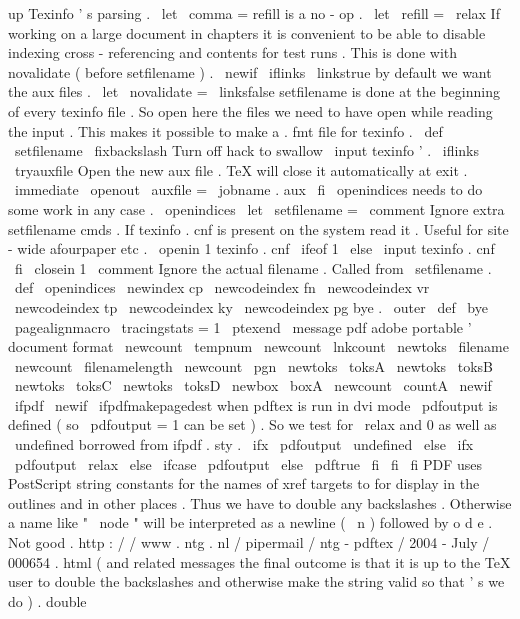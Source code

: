 up
%
Texinfo
'
s
parsing
.
%
\
let
\
comma
=
%
refill
is
a
no
-
op
.
\
let
\
refill
=
\
relax
%
If
working
on
a
large
document
in
chapters
it
is
convenient
to
%
be
able
to
disable
indexing
cross
-
referencing
and
contents
for
test
runs
.
%
This
is
done
with
novalidate
(
before
setfilename
)
.
%
\
newif
\
iflinks
\
linkstrue
%
by
default
we
want
the
aux
files
.
\
let
\
novalidate
=
\
linksfalse
%
setfilename
is
done
at
the
beginning
of
every
texinfo
file
.
%
So
open
here
the
files
we
need
to
have
open
while
reading
the
input
.
%
This
makes
it
possible
to
make
a
.
fmt
file
for
texinfo
.
\
def
\
setfilename
{
%
\
fixbackslash
%
Turn
off
hack
to
swallow
\
input
texinfo
'
.
\
iflinks
\
tryauxfile
%
Open
the
new
aux
file
.
TeX
will
close
it
automatically
at
exit
.
\
immediate
\
openout
\
auxfile
=
\
jobname
.
aux
\
fi
%
\
openindices
needs
to
do
some
work
in
any
case
.
\
openindices
\
let
\
setfilename
=
\
comment
%
Ignore
extra
setfilename
cmds
.
%
%
If
texinfo
.
cnf
is
present
on
the
system
read
it
.
%
Useful
for
site
-
wide
afourpaper
etc
.
\
openin
1
texinfo
.
cnf
\
ifeof
1
\
else
\
input
texinfo
.
cnf
\
fi
\
closein
1
%
\
comment
%
Ignore
the
actual
filename
.
}
%
Called
from
\
setfilename
.
%
\
def
\
openindices
{
%
\
newindex
{
cp
}
%
\
newcodeindex
{
fn
}
%
\
newcodeindex
{
vr
}
%
\
newcodeindex
{
tp
}
%
\
newcodeindex
{
ky
}
%
\
newcodeindex
{
pg
}
%
}
%
bye
.
\
outer
\
def
\
bye
{
\
pagealignmacro
\
tracingstats
=
1
\
ptexend
}
\
message
{
pdf
}
%
adobe
portable
'
document
format
\
newcount
\
tempnum
\
newcount
\
lnkcount
\
newtoks
\
filename
\
newcount
\
filenamelength
\
newcount
\
pgn
\
newtoks
\
toksA
\
newtoks
\
toksB
\
newtoks
\
toksC
\
newtoks
\
toksD
\
newbox
\
boxA
\
newcount
\
countA
\
newif
\
ifpdf
\
newif
\
ifpdfmakepagedest
%
when
pdftex
is
run
in
dvi
mode
\
pdfoutput
is
defined
(
so
\
pdfoutput
=
1
%
can
be
set
)
.
So
we
test
for
\
relax
and
0
as
well
as
\
undefined
%
borrowed
from
ifpdf
.
sty
.
\
ifx
\
pdfoutput
\
undefined
\
else
\
ifx
\
pdfoutput
\
relax
\
else
\
ifcase
\
pdfoutput
\
else
\
pdftrue
\
fi
\
fi
\
fi
%
PDF
uses
PostScript
string
constants
for
the
names
of
xref
targets
to
%
for
display
in
the
outlines
and
in
other
places
.
Thus
we
have
to
%
double
any
backslashes
.
Otherwise
a
name
like
"
\
node
"
will
be
%
interpreted
as
a
newline
(
\
n
)
followed
by
o
d
e
.
Not
good
.
%
http
:
/
/
www
.
ntg
.
nl
/
pipermail
/
ntg
-
pdftex
/
2004
-
July
/
000654
.
html
%
(
and
related
messages
the
final
outcome
is
that
it
is
up
to
the
TeX
%
user
to
double
the
backslashes
and
otherwise
make
the
string
valid
so
%
that
'
s
we
do
)
.
%
double
